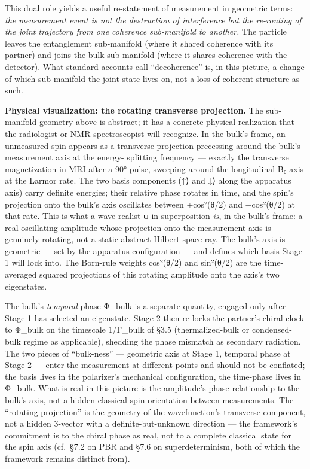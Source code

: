 \documentclass[
]{article}
\begin{document}
This dual role yields a useful re-statement of measurement in geometric
terms: \emph{the measurement event is not the destruction of
interference but the re-routing of the joint trajectory from one
coherence sub-manifold to another.} The particle leaves the entanglement
sub-manifold (where it shared coherence with its partner) and joins the
bulk sub-manifold (where it shares coherence with the detector). What
standard accounts call ``decoherence'' is, in this picture, a change of
which sub-manifold the joint state lives on, not a loss of coherent
structure as such.

\textbf{Physical visualization: the rotating transverse projection.} The
sub-manifold geometry above is abstract; it has a concrete physical
realization that the radiologist or NMR spectroscopist will recognize.
In the bulk's frame, an unmeasured spin appears as a transverse
projection precessing around the bulk's measurement axis at the energy-
splitting frequency --- exactly the transverse magnetization in MRI
after a 90° pulse, sweeping around the longitudinal B₀ axis at the
Larmor rate. The two basis components (\textbar↑⟩ and \textbar↓⟩ along
the apparatus axis) carry definite energies; their relative phase
rotates in time, and the spin's projection onto the bulk's axis
oscillates between +cos²(θ/2) and −cos²(θ/2) at that rate. This is what
a wave-realist ψ in superposition \emph{is}, in the bulk's frame: a real
oscillating amplitude whose projection onto the measurement axis is
genuinely rotating, not a static abstract Hilbert-space ray. The bulk's
axis is geometric --- set by the apparatus configuration --- and defines
which basis Stage 1 will lock into. The Born-rule weights cos²(θ/2) and
sin²(θ/2) are the time-averaged squared projections of this rotating
amplitude onto the axis's two eigenstates.

The bulk's \emph{temporal} phase Φ\_bulk is a separate quantity, engaged
only after Stage 1 has selected an eigenstate. Stage 2 then re-locks the
partner's chiral clock to Φ\_bulk on the timescale 1/Γ\_bulk of §3.5
(thermalized-bulk or condensed-bulk regime as applicable), shedding the
phase mismatch as secondary radiation. The two pieces of ``bulk-ness''
--- geometric axis at Stage 1, temporal phase at Stage 2 --- enter the
measurement at different points and should not be conflated; the basis
lives in the polarizer's mechanical configuration, the time-phase lives
in Φ\_bulk. What is real in this picture is the amplitude's phase
relationship to the bulk's axis, not a hidden classical spin orientation
between measurements. The ``rotating projection'' is the geometry of the
wavefunction's transverse component, not a hidden 3-vector with a
definite-but-unknown direction --- the framework's commitment is to the
chiral phase as real, not to a complete classical state for the spin
axis (cf.~§7.2 on PBR and §7.6 on superdeterminism, both of which the
framework remains distinct from).
\end{document}
